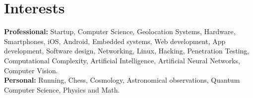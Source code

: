 \documentclass[]{friggeri-cv} %
\begin{document}

\section{Interests}
\vspace{-3mm}
\textbf{Professional:} Startup, Computer Science, Geolocation Systems, Hardware, Smartphones, iOS, Android, Embedded systems, Web development, App development, Software design, Networking, Linux, Hacking, Penetration Testing, Computational Complexity, Artificial Intelligence, Artificial Neural Networks, Computer Vision.\\
\textbf{Personal:} Running, Chess, Cosmology, Astronomical observations, Quantum Computer Science, Physics and Math.

\clearpage
\end{document}
